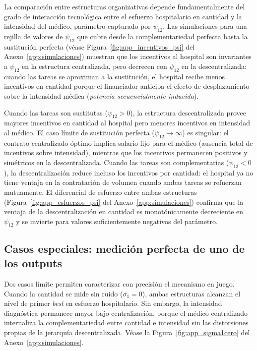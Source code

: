 \documentclass[12pt, a4paper, twoside, openright]{book}
\theoremstyle{plain}
\theoremstyle{definition}
\theoremstyle{remark}
\begin{document}
La comparación entre estructuras organizativas depende fundamentalmente del grado de interacción tecnológica entre el esfuerzo hospitalario en cantidad y la intensidad del médico, parámetro capturado por $\psi_{12}$. Las simulaciones para una rejilla de valores de $\psi_{12}$ que cubre desde la complementariedad perfecta hasta la sustitución perfecta (véase Figura~\ref{fig:app_incentivos_psi} del Anexo~\ref{app:simulaciones}) muestran que los incentivos al hospital son invariantes a $\psi_{12}$ en la estructura centralizada, pero decrecen con $\psi_{12}$ en la descentralizada: cuando las tareas se aproximan a la sustitución, el hospital recibe menos incentivos en cantidad porque el financiador anticipa el efecto de desplazamiento sobre la intensidad médica (\textit{potencia secuencialmente inducida}).

Cuando las tareas son sustitutas ($\psi_{12}>0$), la estructura descentralizada provee mayores incentivos en cantidad al hospital pero menores incentivos en intensidad al médico. El caso límite de sustitución perfecta ($\psi_{12}\to\infty$) es singular: el contrato centralizado óptimo implica salario fijo para el médico (ausencia total de incentivos sobre intensidad), mientras que los incentivos permanecen positivos y simétricos en la descentralizada. Cuando las tareas son complementarias ($\psi_{12}<0$), la descentralización reduce incluso los incentivos por cantidad: el hospital ya no tiene ventaja en la contratación de volumen cuando ambas tareas se refuerzan mutuamente. El diferencial de esfuerzo entre ambas estructuras (Figura~\ref{fig:app_esfuerzos_psi} del Anexo~\ref{app:simulaciones}) confirma que la ventaja de la descentralización en cantidad es monotónicamente decreciente en $\psi_{12}$ y se invierte para valores suficientemente negativos del parámetro.

\subsection{Casos especiales: medición perfecta de uno de los outputs}

Dos casos límite permiten caracterizar con precisión el mecanismo en juego. Cuando la cantidad se mide sin ruido ($\sigma_1=0$), ambas estructuras alcanzan el nivel de primer \textit{best} en esfuerzo hospitalario. Sin embargo, la intensidad diagnóstica permanece mayor bajo centralización, porque el médico centralizado internaliza la complementariedad entre cantidad e intensidad sin las distorsiones propias de la jerarquía descentralizada. Véase la Figura~\ref{fig:app_sigma1cero} del Anexo~\ref{app:simulaciones}.
\end{document}
